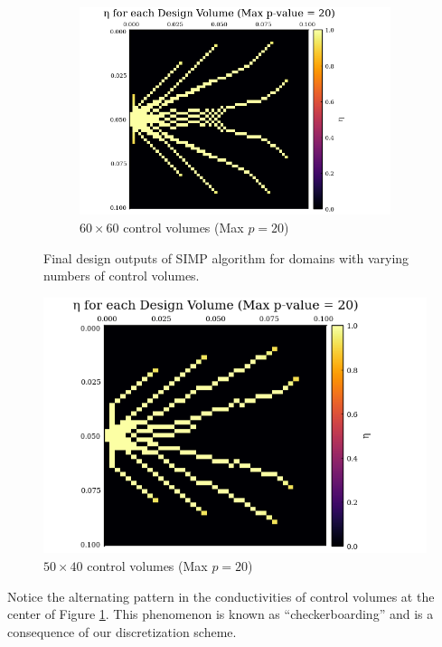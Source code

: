 \begin{center}
\begin{figure}
\begin{center}
\begin{subfigure}{0.75\textwidth}
		\centering
		\includegraphics[width=\linewidth]{Chapter_III_Implementation_and_Results/Images/60x60-Final_Design.png}
		\caption{$60\times 60$ control volumes (Max $p=20$)}
		\label{fig:SIMP-Output-60}
	\end{subfigure}
	\end{center}
	\caption[Designs for Varying Numbers of Control Volumes]{Final design outputs of SIMP algorithm for domains with varying numbers of control volumes.}
	\label{fig:SIMP-Outputs-20-40-60}
\end{figure}
\end{center}

\begin{figure}
	\centering
	\includegraphics[width=0.75\linewidth]{Chapter_III_Implementation_and_Results/Images/50x40-Final_Design.png}
	\caption[Rectangular Control Volume Design]{$50\times 40$ control volumes (Max $p=20$)}\label{fig:SIMP-Output-50-40}
\end{figure}

Notice the alternating pattern in the conductivities of control volumes at the center of Figure \ref{fig:SIMP-Output-60}. This phenomenon is known as ``checkerboarding'' and is a consequence of our discretization scheme.

